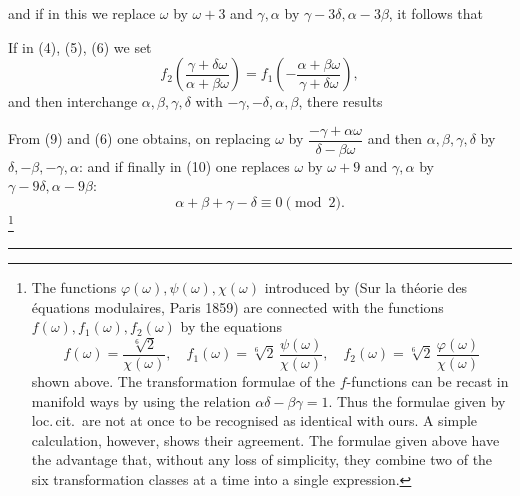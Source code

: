 and if in this we replace $\omega$ by $\omega+3$ and $\gamma, \alpha$ by $\gamma-3\delta, \alpha-3\beta$, it follows that

If in (4), (5), (6) we set
\[
f_2\!\left(\frac{\gamma+\delta\omega}{\alpha+\beta\omega}\right) = f_1\!\left(-\frac{\alpha+\beta\omega}{\gamma+\delta\omega}\right),
\]
and then interchange $\alpha, \beta, \gamma, \delta$ with $-\gamma, -\delta, \alpha, \beta$, there results

From (9) and (6) one obtains, on replacing $\omega$ by $\dfrac{-\gamma+\alpha\omega}{\delta-\beta\omega}$ and then $\alpha, \beta, \gamma, \delta$ by $\delta, -\beta, -\gamma, \alpha$:
and if finally in (10) one replaces $\omega$ by $\omega+9$ and $\gamma, \alpha$ by $\gamma-9\delta, \alpha-9\beta$:
\[
\alpha+\beta+\gamma-\delta \equiv 0 \pmod{2}.
\]
\footnote{The functions $\varphi(\omega), \psi(\omega), \chi(\omega)$ introduced by  (Sur la théorie des équations modulaires, Paris 1859) are connected with the functions $f(\omega), f_1(\omega), f_2(\omega)$ by the equations
\[
f(\omega) = \frac{\sqrt[6]{2}}{\chi(\omega)}, \quad f_1(\omega) = \sqrt[6]{2}\,\frac{\psi(\omega)}{\chi(\omega)}, \quad f_2(\omega) = \sqrt[6]{2}\,\frac{\varphi(\omega)}{\chi(\omega)}
\]
shown above. The transformation formulae of the $f$-functions can be recast in manifold ways by using the relation $\alpha\delta-\beta\gamma=1$. Thus the formulae given by  loc.\,cit.\ are not at once to be recognised as identical with ours. A simple calculation, however, shows their agreement. The formulae given above have the advantage that, without any loss of simplicity, they combine two of the six transformation classes at a time into a single expression.}

\begin{center}\rule{2cm}{0.4pt}\end{center}
